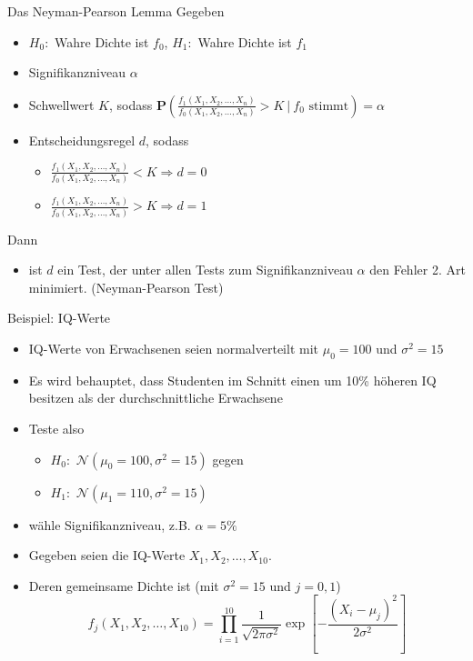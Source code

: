 \documentclass[t,11pt]{beamer}
\begin{document}
\begin{frame}
	\begin{alertblock}{Das Neyman-Pearson Lemma}
		Gegeben
		\begin{itemize}
			\item $H_0:$ Wahre Dichte ist $f_0$, $H_1:$ Wahre Dichte ist $f_1$
			\item Signifikanzniveau $\alpha$
			\item Schwellwert $K$, sodass $ \mathbf{P}\left(\frac{f_1(X_1,X_2,\dots,X_n)}{f_0(X_1,X_2,\dots,X_n)}>K~\bigg\vert~ f_0\text{ stimmt}\right)=\alpha $
			\item Entscheidungsregel $d$, sodass
			\begin{itemize}
				\item $\frac{f_1(X_1,X_2,\dots,X_n)}{f_0(X_1,X_2,\dots,X_n)}<K \Rightarrow d=0$
				\item $\frac{f_1(X_1,X_2,\dots,X_n)}{f_0(X_1,X_2,\dots,X_n)}>K \Rightarrow d=1$
			\end{itemize}
		\end{itemize}
			Dann 
			\begin{itemize}
				\item ist $d$ ein Test, der unter allen Tests zum Signifikanzniveau $\alpha$ den Fehler 2. Art minimiert. (Neyman-Pearson Test)
			\end{itemize}
	\end{alertblock}
\end{frame}


\begin{frame}
	\begin{block}{Beispiel: IQ-Werte}
		\begin{itemize}[<+->]
			\item IQ-Werte von Erwachsenen seien normalverteilt mit $\mu_0=100$ und $\sigma^2 =15$
			\item Es wird behauptet, dass Studenten im Schnitt einen um 10\% höheren IQ besitzen als der durchschnittliche Erwachsene
			\item Teste also
			\begin{itemize}
				\item $H_0:$ $\mathcal{N}(\mu_0=100,\sigma^2=15)$ gegen
				\item $H_1:$ $\mathcal{N}(\mu_1=110,\sigma^2=15)$
			\end{itemize}
			\item wähle Signifikanzniveau, z.B. $\alpha=5\%$
			\item Gegeben seien die IQ-Werte $X_1,X_2,\dots,X_{10}$.
			\item Deren gemeinsame Dichte ist (mit $\sigma^2=15$ und $j=0,1$)
			$$f_j(X_1,X_2,\dots,X_{10})=\prod_{i=1}^{10}\frac{1}{\sqrt{2\pi\sigma^2}}\exp \left[-\frac{(X_i-\mu_j)^2}{2\sigma^2}\right]$$
		\end{itemize}
	\end{block}
\end{frame}
\end{document}
